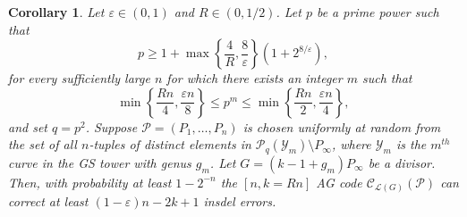 \documentclass[draft, onecolumn, 11pt]{IEEEtran}
\newtheorem{corollary}[theorem]{Corollary}
\begin{document}
\begin{corollary}
    Let $\varepsilon \in (0,1)$ and $R \in (0, 1/2)$. Let $p$ be a prime power such that 
    $$p \geq 1 + \max\left\lbrace \frac{4}{R}, \frac{8}{\varepsilon}\right\rbrace \left(1 +2^{8/\varepsilon}\right),$$
    for every sufficiently large $n$ for which there exists an integer $m$ such that $$ \min\left\lbrace \frac{Rn}{4}, \frac{\varepsilon n}{8}  \right\rbrace \leq p^m \leq \min\left\lbrace \frac{Rn}{2}, \frac{\varepsilon n}{4}\right\rbrace,$$
    and set $q = p^2$. 
    Suppose $\mathcal{P} = (P_1, \dots, P_n)$ is chosen uniformly at random from the set of all $n$-tuples of distinct elements in $\mathcal{P}_q(\mathcal{Y}_m) \setminus P_\infty$, where $\mathcal{Y}_m$ is the $m^{th}$ curve in the GS tower with genus $g_m$. Let $G = (k - 1 + g_m)P_{\infty}$ be a divisor. Then, with probability at least $1-2^{-n}$ the $[n, k = Rn]$ AG code $\mathcal{C}_{\mathcal{L}(G)}(\mathcal{P})$ can correct at least $(1-\varepsilon)n - 2k + 1$ insdel errors.
\end{corollary}
\end{document}

